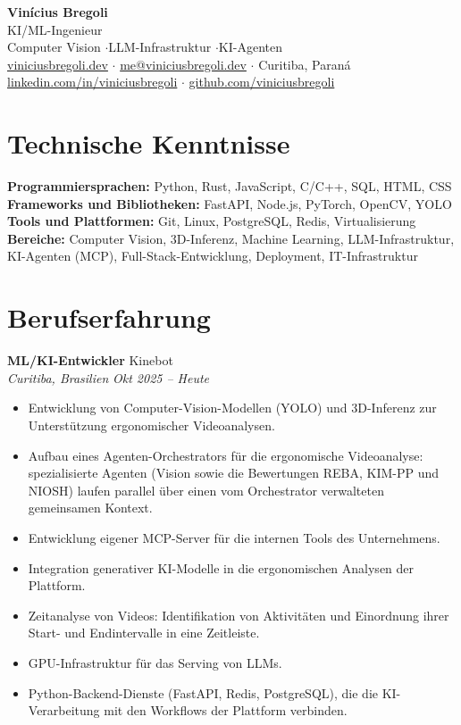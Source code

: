 \documentclass[11pt,a4paper]{article}
\newcommand{\entry}[4]{
    \textbf{#1} \hfill #2 \\
    \textit{#3} \hfill \textit{#4}
}
\begin{document}
\begin{center}
    {\LARGE\bfseries Vinícius Bregoli} \\[4pt]
    KI/ML-Ingenieur \\[1pt]
    Computer Vision \enspace$\cdot$\enspace LLM-Infrastruktur \enspace$\cdot$\enspace KI-Agenten \\[6pt]
    \href{https://www.viniciusbregoli.dev}{viniciusbregoli.dev} \enspace$\cdot$\enspace
    \href{mailto:me@viniciusbregoli.dev}{me@viniciusbregoli.dev} \enspace$\cdot$\enspace
    Curitiba, Paraná \\[2pt]
    \href{https://linkedin.com/in/viniciusbregoli/}{linkedin.com/in/viniciusbregoli} \enspace$\cdot$\enspace
    \href{https://github.com/viniciusbregoli}{github.com/viniciusbregoli}
\end{center}

\section{Technische Kenntnisse}
\noindent\textbf{Programmiersprachen:} Python, Rust, JavaScript, C/C++, SQL, HTML, CSS \\
\textbf{Frameworks und Bibliotheken:} FastAPI, Node.js, PyTorch, OpenCV, YOLO \\
\textbf{Tools und Plattformen:} Git, Linux, PostgreSQL, Redis, Virtualisierung \\
\textbf{Bereiche:} Computer Vision, 3D-Inferenz, Machine Learning, LLM-Infrastruktur, KI-Agenten (MCP), Full-Stack-Entwicklung, Deployment, IT-Infrastruktur

\section{Berufserfahrung}

\entry{ML/KI-Entwickler}{Kinebot}{Curitiba, Brasilien}{Okt 2025 -- Heute}
\begin{itemize}[nosep, leftmargin=*]
    \item Entwicklung von Computer-Vision-Modellen (YOLO) und 3D-Inferenz zur Unterstützung ergonomischer Videoanalysen.
    \item Aufbau eines Agenten-Orchestrators für die ergonomische Videoanalyse: spezialisierte Agenten (\mbox{Vision} sowie die Bewertungen REBA, KIM-PP und NIOSH) laufen parallel über einen vom Orchestrator verwalteten gemeinsamen Kontext.
    \item Entwicklung eigener MCP-Server für die internen Tools des Unternehmens.
    \item Integration generativer KI-Modelle in die ergonomischen Analysen der Plattform.
    \item Zeitanalyse von Videos: Identifikation von Aktivitäten und Einordnung ihrer Start- und Endintervalle in eine Zeitleiste.
    \item GPU-Infrastruktur für das Serving von LLMs.
    \item Python-Backend-Dienste (FastAPI, Redis, PostgreSQL), die die KI-Verarbeitung mit den Workflows der Plattform verbinden.
\end{itemize}
\end{document}
